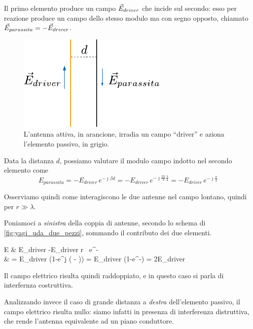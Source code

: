 Il primo elemento produce un campo $\vec{E}_{driver}$ che incide sul secondo: esso per reazione produce un campo dello stesso modulo ma con segno opposto, chiamato $\vec{E}_{parassita} = -\vec{E}_{driver}$.

\begin{figure}[htp]
	\centering
	\includegraphics[]{img/yagi_uda_due_pezzi.pdf}
	\caption{L'antenna attiva, in arancione, irradia un campo ``driver'' e aziona l'elemento passivo, in grigio.}
	\label{fig:yagi_uda_due_pezzi}
\end{figure}

Data la distanza $d$, possiamo valutare il modulo campo indotto nel secondo elemento come
\begin{equation}
	E_{parassita}
	= -E_{driver} \,e^{-\jmath \beta d}
	= -E_{driver} \,e^{-\jmath \frac{2 \pi}{\lambda} \frac{\lambda}{4}}
	= -E_{driver} \, e^{-\jmath \frac{\pi}{2}}
\end{equation}

Osserviamo quindi come interagiscono le due antenne nel campo lontano, quindi per $r \gg \lambda$.

Poniamoci a \emph{sinistra} della coppia di antenne, secondo lo schema di \autoref{fig:yagi_uda_due_pezzi}, sommando il contributo dei due elementi.
\begin{esp}
	E
	& \propto E_{driver}
	-E_{driver}
	 {r}
	\, e^{-\jmath{}} \\
	& = E_{driver}  (1-e^{j (\beta{} - )})
	= E_{driver} (1-e^{-\jmath\pi})
	= 2E_{driver}
\end{esp}

Il campo elettrico risulta quindi raddoppiato, e in questo caso si parla di interfernza costruttiva.

Analizzando invece il caso di grande distanza a \emph{destra} dell'elemento passivo, il campo elettrico risulta nullo: siamo infatti in presenza di interferenza distruttiva, che rende l'antenna equivalente ad un piano conduttore.

